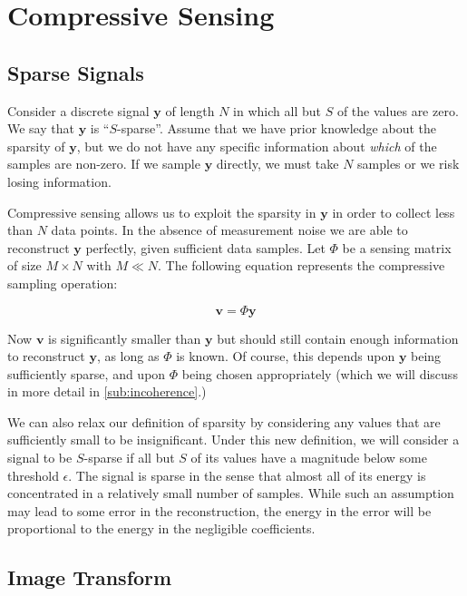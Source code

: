 \documentclass{IEEEtran}
\newcommand{\bfv}{\mathbf{v}}
\newcommand{\bfy}{\mathbf{y}}
\begin{document}
\section{Compressive Sensing}

\subsection{Sparse Signals}
Consider a discrete signal $\bfy$ of length $N$ in which all but $S$ of the values are zero. We say that $\bfy$ is ``$S$-sparse''.  Assume that we have prior knowledge about the sparsity of $\bfy$, but we do not have any specific information about \emph{which} of the samples are non-zero. If we sample $\bfy$ directly, we must take $N$ samples or we risk losing information.

Compressive sensing allows us to exploit the sparsity in $\bfy$ in order to collect less than $N$ data points.  In the absence of measurement noise we are able to reconstruct $\bfy$ perfectly, given sufficient data samples. Let $\Phi$ be a sensing matrix of size $M \times N$ with $M \ll N$. The following equation represents the compressive sampling operation:

\begin{equation}
  \label{eq:sense}
  \bfv = \Phi \bfy
\end{equation}

Now $\bfv$ is significantly smaller than $\bfy$ but should still contain enough information to reconstruct $\bfy$, as long as $\Phi$ is known. Of course, this depends upon $\bfy$ being sufficiently sparse, and upon $\Phi$ being chosen appropriately (which we will discuss in more detail in \ref{sub:incoherence}.)

We can also relax our definition of sparsity by considering any values that are sufficiently small to be insignificant.  Under this new definition, we will consider a signal to be $S$-sparse if all but $S$ of its values have a magnitude below some threshold $\epsilon$.  The signal is sparse in the sense that almost all of its energy is concentrated in a relatively small number of samples.  While such an assumption may lead to some error in the reconstruction, the energy in the error will be proportional to the energy in the negligible coefficients.

\subsection{Image Transform}
\end{document}
